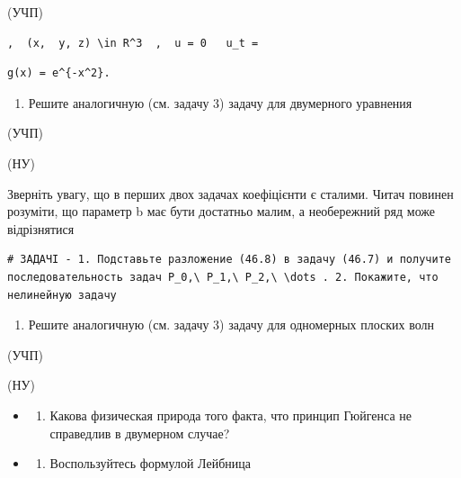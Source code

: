 \documentclass[
  ukrainian,
]{article}
\providecommand{\tightlist}{%
  \setlength{\itemsep}{0pt}\setlength{\parskip}{0pt}}
\begin{document}
(УЧП)

\begin{verbatim}
,  (x,  y, z) \in R^3  ,  u = 0   u_t =
\end{verbatim}

\begin{verbatim}
g(x) = e^{-x^2}.
\end{verbatim}

\begin{enumerate}
\def\labelenumi{\arabic{enumi}.}
\setcounter{enumi}{3}
\tightlist
\item
  Решите аналогичную (см. задачу 3) задачу для двумерного уравнения
\end{enumerate}

(УЧП)

(НУ)

Зверніть увагу, що в перших двох задачах коефіцієнти є сталими. Читач
повинен розуміти, що параметр b має бути достатньо малим, а необережний
ряд може відрізнятися

\begin{verbatim}
# ЗАДАЧІ - 1. Подставьте разложение (46.8) в задачу (46.7) и получите последовательность задач P_0,\ P_1,\ P_2,\ \dots . 2. Покажите, что нелинейную задачу
\end{verbatim}

\begin{enumerate}
\def\labelenumi{\arabic{enumi}.}
\setcounter{enumi}{4}
\tightlist
\item
  Решите аналогичную (см. задачу 3) задачу для одномерных плоских волн
\end{enumerate}

(УЧП)

(НУ)

\begin{itemize}
\tightlist
\item
  \begin{enumerate}
  \def\labelenumi{\arabic{enumi}.}
  \setcounter{enumi}{5}
  \tightlist
  \item
    Какова физическая природа того факта, что принцип Гюйгенса не
    справедлив в двумерном случае?
  \end{enumerate}
\item
  \begin{enumerate}
  \def\labelenumi{\arabic{enumi}.}
  \setcounter{enumi}{6}
  \tightlist
  \item
    Воспользуйтесь формулой Лейбница
  \end{enumerate}
\end{itemize}
\end{document}
